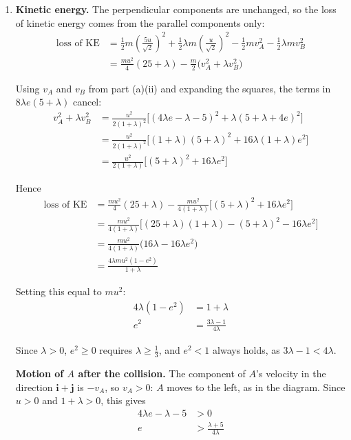 \documentclass[leqno]{article}
\begin{document}
\begin{enumerate}[
  label=\textbf{\arabic*.},
  leftmargin=*,
  topsep=0pt,
  partopsep=0pt,
  parsep=0pt
]
\begin{djsSolution}
\begin{enumerate}[label=\textbf{(\alph*)}, start=1]
\begin{enumerate}[label=(\roman*), start=1]
\end{enumerate}
\item \textbf{Kinetic energy.} The perpendicular components are unchanged, so the loss of kinetic energy comes from the parallel components only:
\begin{align*}
\text{loss of KE}&=\frac12m\left(\frac{5u}{\sqrt2}\right)^2+\frac12\lambda m\left(\frac{u}{\sqrt2}\right)^2-\frac12mv_A^2-\frac12\lambda mv_B^2\\
&=\frac{mu^2}{4}(25+\lambda)-\frac{m}{2}\bigl(v_A^2+\lambda v_B^2\bigr)
\end{align*}

Using \(v_A\) and \(v_B\) from part (a)(ii) and expanding the squares, the terms in \(8\lambda e(5+\lambda)\) cancel:
\begin{align*}
v_A^2+\lambda v_B^2&=\frac{u^2}{2(1+\lambda)^2}\bigl[(4\lambda e-\lambda-5)^2+\lambda(5+\lambda+4e)^2\bigr]\\
&=\frac{u^2}{2(1+\lambda)^2}\bigl[(1+\lambda)(5+\lambda)^2+16\lambda(1+\lambda)e^2\bigr]\\
&=\frac{u^2}{2(1+\lambda)}\bigl[(5+\lambda)^2+16\lambda e^2\bigr]
\end{align*}

Hence
\begin{align*}
\text{loss of KE}&=\frac{mu^2}{4}(25+\lambda)-\frac{mu^2}{4(1+\lambda)}\bigl[(5+\lambda)^2+16\lambda e^2\bigr]\\
&=\frac{mu^2}{4(1+\lambda)}\bigl[(25+\lambda)(1+\lambda)-(5+\lambda)^2-16\lambda e^2\bigr]\\
&=\frac{mu^2}{4(1+\lambda)}\bigl(16\lambda-16\lambda e^2\bigr)\\
&=\frac{4\lambda mu^2(1-e^2)}{1+\lambda}
\end{align*}

Setting this equal to \(mu^2\):
\begin{align*}
4\lambda(1-e^2)&=1+\lambda\\
e^2&=\frac{3\lambda-1}{4\lambda}
\end{align*}

Since \(\lambda>0\), \(e^2\geq0\) requires \(\lambda\geq\frac13\), and \(e^2<1\) always holds, as \(3\lambda-1<4\lambda\).

\textbf{Motion of \(A\) after the collision.} The component of \(A\)'s velocity in the direction \(\mathbf{i}+\mathbf{j}\) is \(-v_A\), so \(v_A>0\): \(A\) moves to the left, as in the diagram. Since \(u>0\) and \(1+\lambda>0\), this gives
\begin{align*}
4\lambda e-\lambda-5&>0\\
e&>\frac{\lambda+5}{4\lambda}
\end{align*}


\end{enumerate}
\end{djsSolution}
\end{enumerate}
\end{document}
